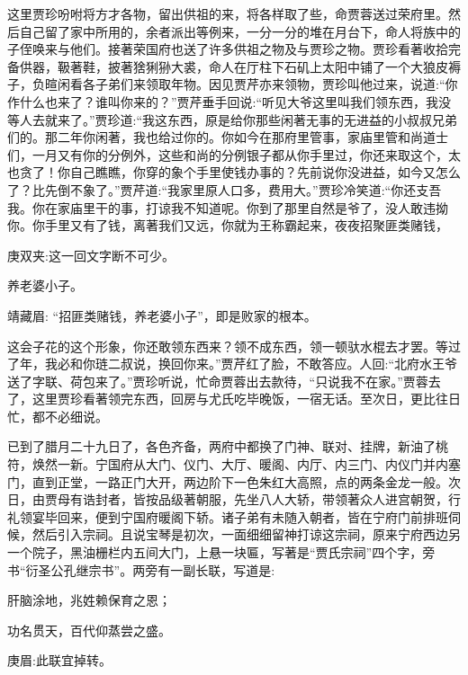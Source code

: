 \begin{parag}
    这里贾珍吩咐将方才各物，留出供祖的来，将各样取了些，命贾蓉送过荣府里。然后自己留了家中所用的，余者派出等例来，一分一分的堆在月台下，命人将族中的子侄唤来与他们。接著荣国府也送了许多供祖之物及与贾珍之物。贾珍看著收拾完备供器，靸著鞋，披著猞猁狲大裘，命人在厅柱下石矶上太阳中铺了一个大狼皮褥子，负暄闲看各子弟们来领取年物。因见贾芹亦来领物，贾珍叫他过来，说道:“你作什么也来了？谁叫你来的？”贾芹垂手回说:“听见大爷这里叫我们领东西，我没等人去就来了。”贾珍道:“我这东西，原是给你那些闲著无事的无进益的小叔叔兄弟们的。那二年你闲著，我也给过你的。你如今在那府里管事，家庙里管和尚道士们，一月又有你的分例外，这些和尚的分例银子都从你手里过，你还来取这个，太也贪了！你自己瞧瞧，你穿的象个手里使钱办事的？先前说你没进益，如今又怎么了？比先倒不象了。”贾芹道:“我家里原人口多，费用大。”贾珍冷笑道:“你还支吾我。你在家庙里干的事，打谅我不知道呢。你到了那里自然是爷了，没人敢违拗你。你手里又有了钱，离著我们又远，你就为王称霸起来，夜夜招聚匪类赌钱，\begin{note}庚双夹:这一回文字断不可少。\end{note}养老婆小子。\begin{note}靖藏眉: “招匪类赌钱，养老婆小子”，即是败家的根本。\end{note}这会子花的这个形象，你还敢领东西来？领不成东西，领一顿驮水棍去才罢。等过了年，我必和你琏二叔说，换回你来。”贾芹红了脸，不敢答应。人回:“北府水王爷送了字联、荷包来了。”贾珍听说，忙命贾蓉出去款待，“只说我不在家。”贾蓉去了，这里贾珍看著领完东西，回房与尤氏吃毕晚饭，一宿无话。至次日，更比往日忙，都不必细说。
\end{parag}


\begin{parag}
    已到了腊月二十九日了，各色齐备，两府中都换了门神、联对、挂牌，新油了桃符，焕然一新。宁国府从大门、仪门、大厅、暖阁、内厅、内三门、内仪门并内塞门，直到正堂，一路正门大开，两边阶下一色朱红大高照，点的两条金龙一般。次日，由贾母有诰封者，皆按品级著朝服，先坐八人大轿，带领著众人进宫朝贺，行礼领宴毕回来，便到宁国府暖阁下轿。诸子弟有未随入朝者，皆在宁府门前排班伺候，然后引入宗祠。且说宝琴是初次，一面细细留神打谅这宗祠，原来宁府西边另一个院子，黑油栅栏内五间大门，上悬一块匾，写著是“贾氏宗祠”四个字，旁书“衍圣公孔继宗书”。两旁有一副长联，写道是:
\end{parag}


\begin{poem}
    \begin{pl}肝脑涂地，兆姓赖保育之恩；\end{pl}

    \begin{pl}功名贯天，百代仰蒸尝之盛。\end{pl}
    \begin{note}庚眉:此联宜掉转。\end{note}
\end{poem}


